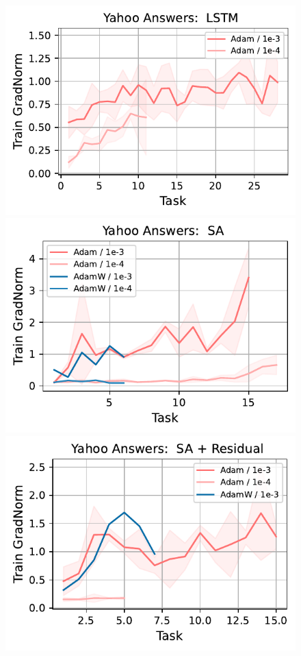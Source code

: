 \begin{figure}[htb!]
{    \includegraphics[width=\textwidth]{figs/GradNorm/nlp/lstm/yahoo_answers_50.pdf}
    \includegraphics[width=\textwidth]{figs/GradNorm/nlp/attention/yahoo_answers_40.pdf}
    \includegraphics[width=\textwidth]{figs/GradNorm/nlp/attention_residual/yahoo_answers_40.pdf}
}
\end{figure}
